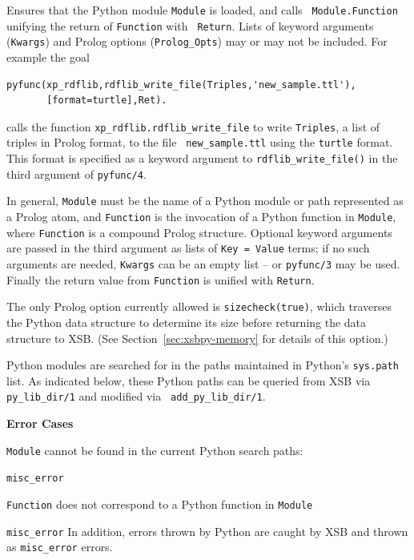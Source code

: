 \begin{description}

%
 Ensures that the Python module {\tt Module} is loaded, and calls {\tt
   Module.Function} unifying the return of {\tt Function} with {\tt 
   Return}.  Lists of keyword arguments ({\tt Kwargs}) and Prolog
 options ({\tt Prolog\_Opts}) may or may not be included.  For example
 the goal

\begin{verbatim}
pyfunc(xp_rdflib,rdflib_write_file(Triples,'new_sample.ttl'),
       [format=turtle],Ret).
\end{verbatim}

calls the function {\tt xp\_rdflib.rdflib\_write\_file} to write
{\tt Triples}, a list of triples in Prolog format, to the file {\tt
  new\_sample.ttl} using the {\tt turtle} format.  This format is
specified as a keyword argument to {\tt rdflib\_write\_file()} in the
third argument of {\tt pyfunc/4}.

In general, {\tt Module} must be the name of a Python module or path
represented as a Prolog atom, and {\tt Function} is the invocation of
a Python function in {\tt Module}, where {\tt Function} is a compound
Prolog structure.  Optional keyword arguments are passed in the third
argument as lists of {\tt Key = Value} terms; if no such arguments are
needed, {\tt Kwargs} can be an empty list -- or {\tt pyfunc/3} may be
used.  Finally the return value from {\tt Function} is unified with
{\tt Return}.

The only Prolog option currently allowed is {\tt sizecheck(true)},
which traverses the Python data structure to determine its size before
returning the data structure to XSB.  (See
Section~\ref{sec:xsbpy-memory} for details of this option.)

Python modules are searched for in the paths maintained in Python's
{\tt sys.path} list.  As indicated below, these Python paths can be
queried from XSB via {\tt py\_lib\_dir/1} and modified via {\tt
  add\_py\_lib\_dir/1}.
     
{\bf Error Cases}
\bi
\item {\tt Module} cannot be found in the current Python search paths:
\bi
\item {\tt misc\_error}
\ei
\item {\tt Function} does not correspond to a Python function in {\tt Module}
\bi
\item {\tt misc\_error}
  \ei \ei
%
  In addition, errors thrown by Python are
  caught by XSB and thrown as {\tt misc\_error} errors.


\end{description}
